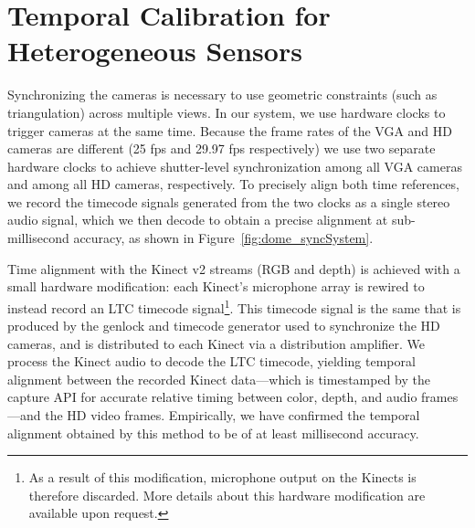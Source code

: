 \section{Temporal Calibration for Heterogeneous Sensors}
Synchronizing the cameras is necessary to use geometric constraints (such as triangulation) across multiple views. In our system, we use hardware clocks to trigger cameras at the same time. Because the frame rates of the VGA and HD cameras are different (25 fps and 29.97 fps respectively) we use two separate hardware clocks to achieve shutter-level synchronization among all VGA cameras and among all HD cameras, respectively. To precisely align both time references, we record the timecode signals generated from the two clocks as a single stereo audio signal, which we then decode to obtain a precise alignment at sub-millisecond accuracy, as shown in Figure~\ref{fig:dome_syncSystem}.

Time alignment with the Kinect v2 streams (RGB and depth) is achieved with a small hardware modification: each Kinect's microphone array is rewired to instead record an LTC timecode signal\footnote{As a result of this modification, microphone output on the Kinects is therefore discarded. More details about this hardware modification are available upon request.}.  This timecode signal is the same that is produced by the genlock and timecode generator used to synchronize the HD cameras, and is distributed to each Kinect via a distribution amplifier. We process the Kinect audio to decode the LTC timecode, yielding temporal alignment between the recorded Kinect data---which is timestamped by the capture API for accurate relative timing between color, depth, and audio frames---and the HD video frames. Empirically, we have confirmed the temporal alignment obtained by this method to be of at least millisecond accuracy.


